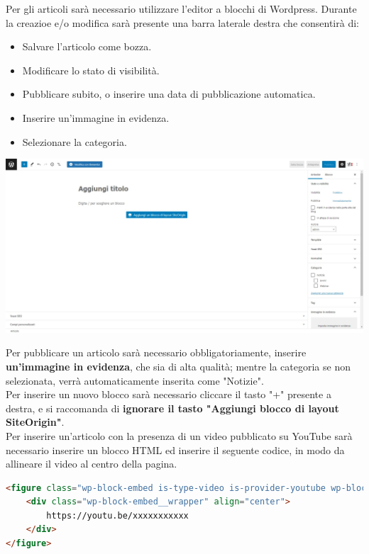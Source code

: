 \documentclass{article}
\begin{document}
	Per gli articoli sarà necessario utilizzare l'editor a blocchi di Wordpress. Durante la creazioe e/o modifica sarà presente una barra laterale destra che consentirà di:
	\begin{itemize}
		\item Salvare l'articolo come bozza.
		\item Modificare lo stato di visibilità.
		\item Pubblicare subito, o inserire una data di pubblicazione automatica.
		\item Inserire un'immagine in evidenza.
		\item Selezionare la categoria.
	\end{itemize}

	\includegraphics[scale=0.19]{Nuovo articolo.jpeg}

	Per pubblicare un articolo sarà necessario obbligatoriamente, inserire \textbf{un'immagine in evidenza}, che sia di alta qualità; mentre la categoria se non selezionata, verrà automaticamente inserita come "Notizie".\\
	Per inserire un nuovo blocco sarà necessario cliccare il tasto "+" presente a destra, e si raccomanda di \textbf{ignorare il tasto "Aggiungi blocco di layout SiteOrigin"}.\\
	Per inserire un'articolo con la presenza di un video pubblicato su YouTube sarà necessario inserire un blocco HTML ed inserire il seguente codice, in modo da allineare il video al centro della pagina.

	\begin{flushleft}
		\begin{lstlisting}[language=html]
<figure class="wp-block-embed is-type-video is-provider-youtube wp-block-embed-youtube wp-embed-aspect-16-9 wp-has-aspect-ratio">
	<div class="wp-block-embed__wrapper" align="center">
		https://youtu.be/xxxxxxxxxxx
	</div>
</figure>
		\end{lstlisting}
	\end{flushleft}
\end{document}
